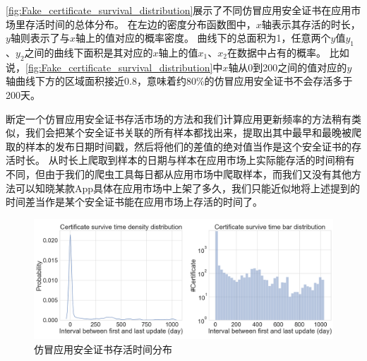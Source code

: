 \autoref{fig:Fake_certificate_survival_distribution}展示了不同仿冒应用安全证书在应用市场里存活时间的总体分布。
在左边的密度分布函数图中，$x$轴表示其存活的时长，$y$轴则表示了与$x$轴上的值对应的概率密度。
曲线下的总面积为1，任意两个$y$值$y_1$、$y_2$之间的曲线下面积是其对应的$x$轴上的值$x_1$、$x_2$在数据中占有的概率。
比如说，\autoref{fig:Fake_certificate_survival_distribution}中$x$轴从0到200之间的值对应的$y$轴曲线下方的区域面积接近0.8，意味着约80\%的仿冒应用安全证书不会存活多于200天。

断定一个仿冒应用安全证书存活市场的方法和我们计算应用更新频率的方法稍有类似，我们会把某个安全证书关联的所有样本都找出来，提取出其中最早和最晚被爬取的样本的发布日期时间戳，然后将他们的差值的绝对值当作是这个安全证书的存活时长。
从时长上爬取到样本的日期与样本在应用市场上实际能存活的时间稍有不同，但由于我们的爬虫工具每日都从应用市场中爬取样本，而我们又没有其他方法可以知晓某款App具体在应用市场中上架了多久，我们只能近似地将上述提到的时间差当作是某个安全证书能在应用市场上存活的时间了。

\begin{figure}[htbp]
	\centering
	\includegraphics[width=\textwidth]{./Figures/edwin-Fake_certificate_survival_distribution2.png}
	\caption{仿冒应用安全证书存活时间分布}
	\label{fig:Fake_certificate_survival_distribution}
\end{figure}

